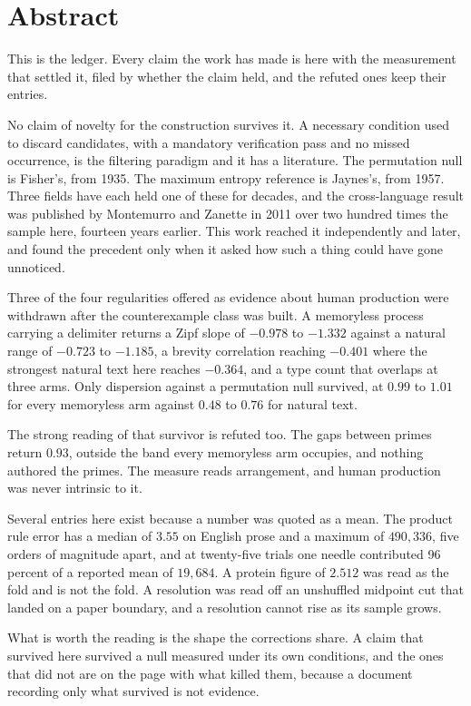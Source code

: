 \chapter*{Abstract}

This is the ledger. Every claim the work has made is here with the measurement that settled it,
filed by whether the claim held, and the refuted ones keep their entries.

No claim of novelty for the construction survives it. A necessary condition used to discard
candidates, with a mandatory verification pass and no missed occurrence, is the filtering paradigm
and it has a literature. The permutation null is Fisher's, from 1935. The maximum entropy reference
is Jaynes's, from 1957. Three fields have each held one of these for decades, and the cross-language
result was published by Montemurro and Zanette in 2011 over two hundred times the sample here,
fourteen years earlier. This work reached it independently and later, and found the precedent only
when it asked how such a thing could have gone unnoticed.

Three of the four regularities offered as evidence about human production were withdrawn after the
counterexample class was built. A memoryless process carrying a delimiter returns a Zipf slope of
$-0.978$ to $-1.332$ against a natural range of $-0.723$ to $-1.185$, a brevity correlation reaching
$-0.401$ where the strongest natural text here reaches $-0.364$, and a type count that overlaps at
three arms. Only dispersion against a permutation null survived, at $0.99$ to $1.01$ for every
memoryless arm against $0.48$ to $0.76$ for natural text.

The strong reading of that survivor is refuted too. The gaps between primes return $0.93$, outside
the band every memoryless arm occupies, and nothing authored the primes. The measure reads
arrangement, and human production was never intrinsic to it.

Several entries here exist because a number was quoted as a mean. The product rule error has a
median of $3.55$ on English prose and a maximum of $490{,}336$, five orders of magnitude apart, and
at twenty-five trials one needle contributed 96 percent of a reported mean of $19{,}684$. A protein
figure of $2.512$ was read as the fold and is not the fold. A resolution was read off an unshuffled
midpoint cut that landed on a paper boundary, and a resolution cannot rise as its sample grows.

What is worth the reading is the shape the corrections share. A claim that survived here survived a
null measured under its own conditions, and the ones that did not are on the page with what killed
them, because a document recording only what survived is not evidence.
\cleardoublepage
